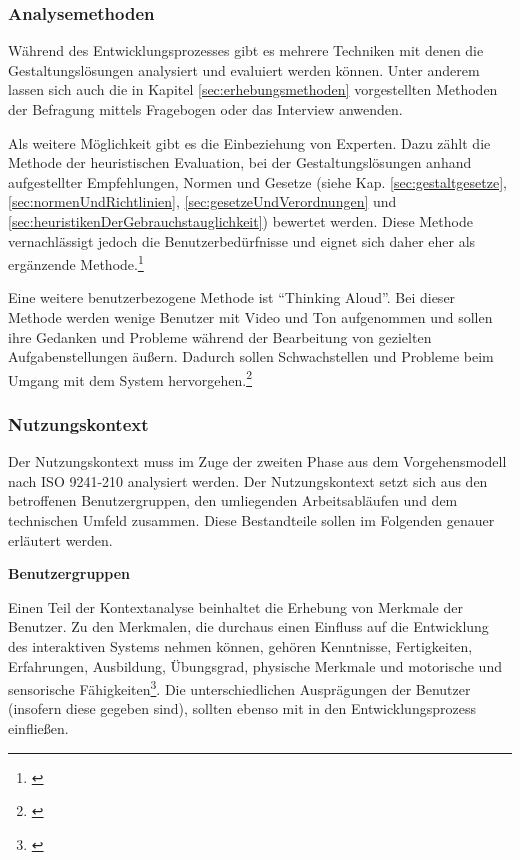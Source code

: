 \subsubsection{Analysemethoden}
\label{sec:analysemethoden}
Während des Entwicklungsprozesses gibt es mehrere Techniken mit denen die Gestaltungslösungen analysiert und evaluiert werden können. Unter anderem lassen sich auch die in Kapitel \ref{sec:erhebungsmethoden} vorgestellten Methoden der Befragung mittels Fragebogen oder das Interview anwenden. 

Als weitere Möglichkeit gibt es die Einbeziehung von Experten. Dazu zählt die Methode der heuristischen Evaluation, bei der Gestaltungslösungen anhand aufgestellter Empfehlungen, Normen und Gesetze (siehe Kap. \ref{sec:gestaltgesetze}, \ref{sec:normenUndRichtlinien}, \ref{sec:gesetzeUndVerordnungen} und \ref{sec:heuristikenDerGebrauchstauglichkeit}) bewertet werden. Diese Methode vernachlässigt jedoch die Benutzerbedürfnisse und eignet sich daher eher als ergänzende Methode.\footnote{\cite[vgl.][249]{Nielsen1990}}

Eine weitere benutzerbezogene Methode ist \enquote{Thinking Aloud}. Bei dieser Methode werden wenige Benutzer mit Video und Ton aufgenommen und sollen ihre Gedanken und Probleme während der Bearbeitung von gezielten Aufgabenstellungen äußern. Dadurch sollen Schwachstellen und Probleme beim Umgang mit dem System hervorgehen.\footnote{\cite[vgl.][51]{Hegner2003}}


\subsubsection{Nutzungskontext}
Der Nutzungskontext muss im Zuge der zweiten Phase aus dem Vorgehensmodell nach ISO 9241-210 analysiert werden. Der Nutzungskontext setzt sich aus den betroffenen Benutzergruppen, den umliegenden Arbeitsabläufen und dem technischen Umfeld zusammen. Diese Bestandteile sollen im Folgenden genauer erläutert werden.

\textbf{Benutzergruppen}

Einen Teil der Kontextanalyse beinhaltet die Erhebung von Merkmale der Benutzer. Zu den Merkmalen, die durchaus einen Einfluss auf die Entwicklung des interaktiven Systems nehmen können, gehören Kenntnisse, Fertigkeiten, Erfahrungen, Ausbildung, Übungsgrad, physische Merkmale und motorische und sensorische Fähigkeiten\footnote{\cite[vgl.][28]{Ecker2016}}. Die unterschiedlichen Ausprägungen der Benutzer (insofern diese gegeben sind), sollten ebenso mit in den Entwicklungsprozess einfließen.

